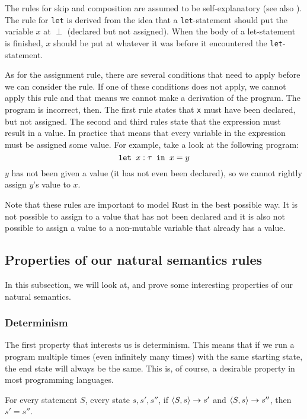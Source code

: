 The rules for skip and composition are assumed to be self-explanatory (see also \cite{nielson1992semantics}). The rule for \texttt{let} is derived from the idea that a \texttt{let}-statement should put the variable $x$ at $\perp$ (declared but not assigned). When the body of a let-statement is finished, $x$ should be put at whatever it was before it encountered the \texttt{let}-statement. 

As for the assignment rule, there are several conditions that need to apply before we can consider the rule. If one of these conditions does not apply, we cannot apply this rule and that means we cannot make a derivation of the program. The program is incorrect, then. The first rule states that \verb|x| must have been declared, but not assigned. The second and third rules state that the expression must result in a value. In practice that means that every variable in the expression must be assigned some value. 
For example, take a look at the following program:
$$\texttt{let }x : \tau \texttt{ in } x=y$$ 
$y$ has not been given a value (it has not even been declared), so we cannot rightly assign $y$'s value to $x$. 

Note that these rules are important to model Rust in the best possible way. It is not possible to assign to a value that has not been declared and it is also not possible to assign a value to a non-mutable variable that already has a value. 

\subsection{Properties of our natural semantics rules}
In this subsection, we will look at, and prove some interesting properties of our natural semantics. 

\subsubsection*{Determinism}

The first property that interests us is determinism. This means that if we run a program multiple times (even infinitely many times) with the same starting state, the end state will always be the same. This is, of course, a desirable property in most programming languages.

\begin{theorem}
For every statement $S$, every state $s, s', s''$, if $\langle S, s \rangle \to s'$ and $\langle S, s \rangle \to s''$, then $s' = s''$.
\end{theorem}

